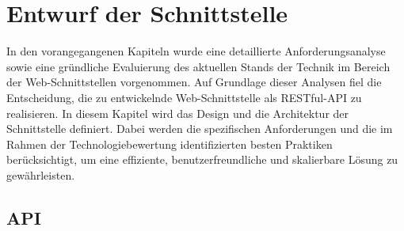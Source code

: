 \documentclass[draft,final]{vutinfth} %
\begin{document}
%	
%	









\chapter{Entwurf der Schnittstelle}

In den vorangegangenen Kapiteln wurde eine detaillierte Anforderungsanalyse sowie eine gründliche Evaluierung des aktuellen Stands der Technik im Bereich der Web-Schnittstellen vorgenommen. 
Auf Grundlage dieser Analysen fiel die Entscheidung, die zu entwickelnde Web-Schnittstelle als RESTful-API zu realisieren.
In diesem Kapitel wird das Design und die Architektur der Schnittstelle definiert. 
Dabei werden die spezifischen Anforderungen und die im Rahmen der Technologiebewertung identifizierten besten Praktiken berücksichtigt, um eine effiziente, benutzerfreundliche und skalierbare Lösung zu gewährleisten.


\section{API}
\end{document}
